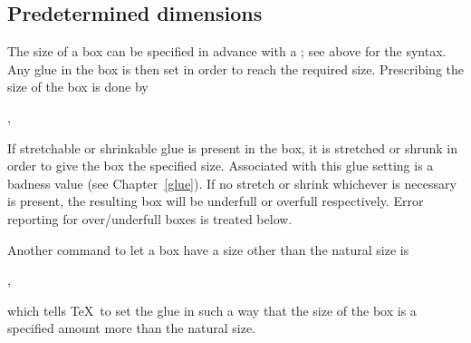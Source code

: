 \documentclass{book}
\begin{document}
\subsection{Predetermined dimensions}

The size of a box can be specified in advance
with a ; see above for the syntax.
Any glue
in the box is then set in order to reach the required size.
Prescribing the size of the box is done by
\begin{disp}   ,
        \end{disp}
If stretchable or shrinkable glue is present in the box,
it is stretched or shrunk in order to give the box the
specified size. Associated with this glue setting is a badness value
(see Chapter~\ref{glue}). If no stretch or shrink \ldash whichever
is necessary \rdash  is present, the resulting box will be underfull
or overfull respectively. Error reporting for over/underfull
boxes is treated below.

Another command to let a box have a size other than
the natural size is
\begin{disp}   ,
        \end{disp}
which tells \TeX\ to set the glue in such a way that
the size of the box is a  specified amount more than the
natural size.
\end{document}
